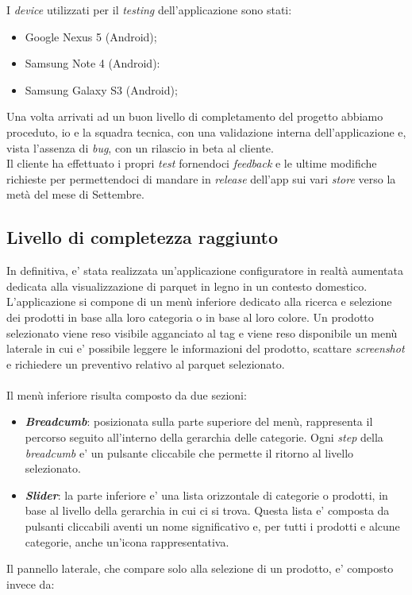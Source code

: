 I \textit{device} utilizzati per il \textit{testing} dell'applicazione sono stati:

\begin{itemize}
	\item Google Nexus 5 (Android);
	\item Samsung Note 4 (Android):
	\item Samsung Galaxy S3 (Android);
\end{itemize}

Una volta arrivati ad un buon livello di completamento del progetto abbiamo proceduto, io e la squadra tecnica, con una validazione interna dell'applicazione e, vista l'assenza di \textit{bug}, con un rilascio in beta al cliente.\\
Il cliente ha effettuato i propri \textit{test} fornendoci \textit{feedback} e le ultime modifiche richieste per permettendoci di mandare in \textit{release} dell'app sui vari \textit{store} verso la met\`a del mese di Settembre.\\

\subsection{Livello di completezza raggiunto}
In definitiva, e' stata realizzata un'applicazione configuratore in realt\`a aumentata dedicata alla visualizzazione di parquet in legno in un contesto domestico. L'applicazione si compone di un men\`u inferiore dedicato alla ricerca e selezione dei prodotti in base alla loro categoria o in base al loro colore. Un prodotto selezionato viene reso visibile agganciato al tag e viene reso disponibile un men\`u laterale in cui e' possibile leggere le informazioni del prodotto, scattare \textit{screenshot} e richiedere un preventivo relativo al parquet selezionato.\\\\
\noindent
Il men\`u inferiore risulta composto da due sezioni:

\begin{itemize}
	\item \textbf{\textit{Breadcumb}}: posizionata sulla parte superiore del men\`u, rappresenta il percorso seguito all'interno della gerarchia delle categorie. Ogni \textit{step} della \textit{breadcumb} e' un pulsante cliccabile che permette il ritorno al livello selezionato.
	\item \textbf{\textit{Slider}}: la parte inferiore e' una lista orizzontale di categorie o prodotti, in base al livello della gerarchia in cui ci si trova. Questa lista e' composta da pulsanti cliccabili aventi un nome significativo e, per tutti i prodotti e alcune categorie, anche un'icona rappresentativa.
\end{itemize}
\noindent
Il pannello laterale, che compare solo alla selezione di un prodotto, e' composto invece da:

